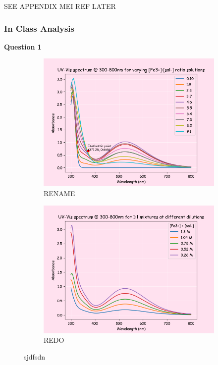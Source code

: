 SEE APPENDIX MEI REF LATER
\subsubsection*{In Class Analysis}
\textbf{Question 1}
\begin{figure}[H]
     \centering
     \begin{subfigure}[b]{0.49\textwidth}
         \centering
         \includegraphics[width=\textwidth]{part2_q1a.png}
         \caption{RENAME}
         \label{fig:part2_q1_a}
     \end{subfigure}
     \hfill
     \begin{subfigure}[b]{0.49\textwidth}
         \centering
         \includegraphics[width=\textwidth]{part2_q1_b.png}
         \caption{REDO}
         \label{fig:part2_q1_b}
     \end{subfigure}
     \caption{sjdfsdn}
     \label{fig:part2q1}
\end{figure}
